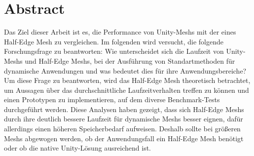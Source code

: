 \section{Abstract}
Das Ziel dieser Arbeit ist es, die Performance von Unity-Meshs mit der eines Half-Edge Mesh zu vergleichen. Im folgenden wird versucht, die folgende Forschungsfrage zu beantworten: Wie unterscheidet sich die Laufzeit von Unity-Meshs und Half-Edge Meshs, bei der Ausf\"uhrung von Standartmethoden f\"ur dynamische Anwendungen und was bedeutet dies f\"ur ihre Anwendungsbereiche?
Um diese Frage zu beantworten, wird das Half-Edge Mesh theoretisch betrachtet, um Aussagen \"uber das durchschnittliche Laufzeitverhalten treffen zu k\"onnen und einen Prototypen zu implementieren, auf dem diverse Benchmark-Tests durchgef\"uhrt werden.
Diese Analysen haben gezeigt, dass sich Half-Edge Meshs durch ihre deutlich bessere Laufzeit f\"ur dynamische Meshs besser eignen, daf\"ur allerdings einen h\"oheren Speicherbedarf aufweisen. Deshalb sollte bei gr\"o{\ss}eren Meshs abgewogen werden, ob der Anwendungsfall ein Half-Edge Mesh ben\"otigt oder ob die native Unity-L\"osung ausreichend ist.